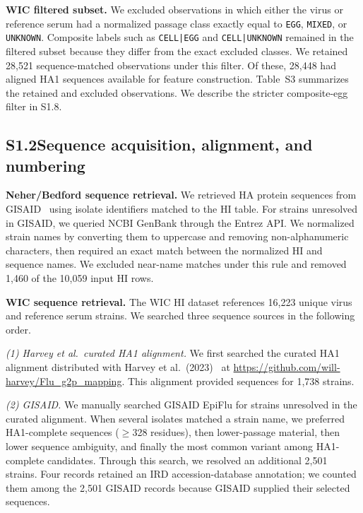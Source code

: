 \documentclass[12pt]{article}
\begin{document}
\textbf{WIC filtered subset.} We excluded observations in which either the virus or reference serum had a normalized passage class exactly equal to \texttt{EGG}, \texttt{MIXED}, or \texttt{UNKNOWN}. Composite labels such as \texttt{CELL|EGG} and \texttt{CELL|UNKNOWN} remained in the filtered subset because they differ from the exact excluded classes. We retained 28,521 sequence-matched observations under this filter. Of these, 28,448 had aligned HA1 sequences available for feature construction. Table~S3 summarizes the retained and excluded observations. We describe the stricter composite-egg filter in S1.8.

\subsection*{S1.2\quad Sequence acquisition, alignment, and numbering}

\textbf{Neher/Bedford sequence retrieval.} We retrieved HA protein sequences from GISAID~\cite{Elbe2017GlobChall, Shu2017EuroSurveillance} using isolate identifiers matched to the HI table. For strains unresolved in GISAID, we queried NCBI GenBank through the Entrez API. We normalized strain names by converting them to uppercase and removing non-alphanumeric characters, then required an exact match between the normalized HI and sequence names. We excluded near-name matches under this rule and removed 1,460 of the 10,059 input HI rows.

\textbf{WIC sequence retrieval.} The WIC HI dataset references 16,223 unique virus and reference serum strains. We searched three sequence sources in the following order.

\textit{(1) Harvey et al.\ curated HA1 alignment.} We first searched the curated HA1 alignment distributed with Harvey et al.\ (2023)~\cite{Harvey2023PLoSComputBiol} at \url{https://github.com/will-harvey/Flu_g2p_mapping}. This alignment provided sequences for 1,738 strains.

\textit{(2) GISAID.} We manually searched GISAID EpiFlu for strains unresolved in the curated alignment. When several isolates matched a strain name, we preferred HA1-complete sequences ($\geq$328 residues), then lower-passage material, then lower sequence ambiguity, and finally the most common variant among HA1-complete candidates. Through this search, we resolved an additional 2,501 strains. Four records retained an IRD accession-database annotation; we counted them among the 2,501 GISAID records because GISAID supplied their selected sequences.
\end{document}
